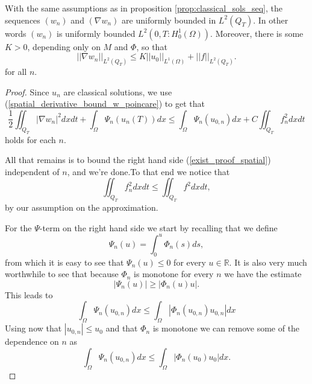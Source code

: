 \documentclass[11pt, a4paper]{article}
\begin{document}
\begin{proposition}
\label{prop:spatial_boundedness}
With the same assumptions as in proposition \ref{prop:classical_sols_seq},
the sequences $(w_n)$ and $(\nabla w_n)$ are uniformly bounded in $L^2(Q_T)$. In other words $(w_n)$ is uniformly bounded $L^2(0,T: H^1_0(\Omega))$. Moreover, there is some $K >0$, depending only on $M$ and $\Phi$, so that
\begin{equation}
\label{gradwn_bound_uniform}
||\nabla w_n||_{L^2(Q_T)} \leq K||u_0||_{L^1(\Omega)} + ||f||_{L^2(Q_T)}.
\end{equation}
for all $n$.
\end{proposition}
\begin{proof}
Since $u_n$ are classical solutions, we use (\ref{spatial_derivative_bound_w_poincare}) to get that
	\begin{equation}
	\label{exist_proof_spatial}
	\frac{1}{2}\iint_{Q_T}|\nabla w_n|^2 dxdt + \int_\Omega \Psi_n(u_n(T))dx  \leq \int_\Omega \Psi_n(u_{0,n})dx + C\iint_{Q_T}f_n^2 dxdt
	\end{equation}
	holds for each $n$.


	All that remains is to bound the right hand side (\ref{exist_proof_spatial}) independent of $n$, and we're done.To that end we notice that
	\begin{equation*}
	\iint_{Q_T}f_n^2dxdt \leq \iint_{Q_T} f^2 dxdt,
	\end{equation*}
	by our assumption on the approximation.
	
	For the $\Psi$-term on the right hand side we start by recalling that we define
	\begin{equation*}
	\Psi_n(u) = \int_0^{u}\Phi_n(s)ds,
	\end{equation*}
	from which it is easy to see that $\Psi_n(u) \leq 0$ for every $u \in \mathbb{R}$. It is also very much worthwhile to see that because $\Phi_n$ is monotone for every $n$ we have the estimate
	\begin{equation*}
	|\Psi_n(u)| \geq |\Phi_n(u)u|.
	\end{equation*}
	This leads to
	\begin{equation*}
	\int_\Omega \Psi_n(u_{0,n})dx \leq \int_\Omega |\Phi_n(u_{0,n})u_{0,n}|dx	
	\end{equation*}
	Using now that $|u_{0,n}| \leq u_0$ and that $\Phi_n$ is monotone we can remove some of the dependence on $n$ as
	\begin{equation*}
	\int_\Omega \Psi_n(u_{0,n})dx \leq \int_\Omega |\Phi_n(u_{0})u_{0}|dx.
	\end{equation*}
	

\end{proof}
\end{document}
